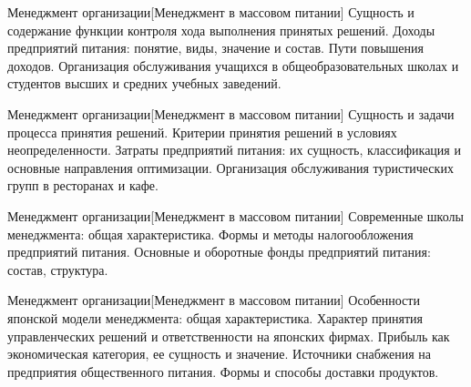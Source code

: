 \documentclass[
	11pt,
	a4paper,
	]
	{article}
\begin{document}
\vfill



\begin{minipage}[t][\miniH]{\miniL}\centering
	 {Менеджмент организации}[Менеджмент в массовом питании]
		{
			Сущность и содержание функции контроля хода выполнения принятых решений.
		}{
			Доходы предприятий питания: понятие, виды, значение и состав. Пути повышения доходов.
		}{
			Организация обслуживания учащихся в общеобразовательных школах и студентов высших и средних учебных заведений.
		}
	\lowGE
\end{minipage}





\begin{minipage}[t][\miniH]{\miniL}\centering
	 {Менеджмент организации}[Менеджмент в массовом питании]
		{
			Сущность и задачи процесса принятия решений. Критерии принятия решений в условиях неопределенности.
		}{
			Затраты предприятий питания: их сущность, классификация и основные направления оптимизации.
		}{
			Организация обслуживания туристических групп в ресторанах и кафе.
		}
	\lowGE
\end{minipage}

\vfill



\begin{minipage}[t][\miniH]{\miniL}\centering
	 {Менеджмент организации}[Менеджмент в массовом питании]
		{
			Современные школы менеджмента: общая характеристика.
		}{
			Формы и методы налогообложения предприятий питания.
		}{
			Основные и оборотные фонды предприятий питания: состав, структура.
		}
	\lowGE
\end{minipage}

\vfill



\begin{minipage}[t][\miniH]{\miniL}\centering
	 {Менеджмент организации}[Менеджмент в массовом питании]
		{
			Особенности японской модели менеджмента: общая характеристика. Характер принятия управленческих решений и ответственности на японских фирмах.
		}{
			Прибыль как экономическая категория, ее сущность и значение.
		}{
			Источники снабжения на предприятия общественного питания. Формы и способы доставки продуктов.
		}
	\lowGE
\end{minipage}
\end{document}

